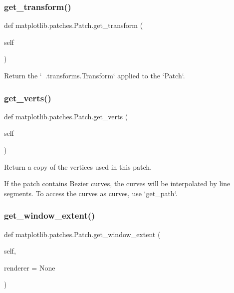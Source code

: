 \subsubsection{\texorpdfstring{get\+\_\+transform()}{get\_transform()}}
{\footnotesize\ttfamily def matplotlib.\+patches.\+Patch.\+get\+\_\+transform (\begin{DoxyParamCaption}\item[{}]{self }\end{DoxyParamCaption})}

\begin{DoxyVerb}Return the `~.transforms.Transform` applied to the `Patch`.\end{DoxyVerb}
 \mbox{\label{classmatplotlib_1_1patches_1_1Patch_a285b62a8f1c9fbc9d8b5579355edb34f}} 
\subsubsection{\texorpdfstring{get\+\_\+verts()}{get\_verts()}}
{\footnotesize\ttfamily def matplotlib.\+patches.\+Patch.\+get\+\_\+verts (\begin{DoxyParamCaption}\item[{}]{self }\end{DoxyParamCaption})}

\begin{DoxyVerb}Return a copy of the vertices used in this patch.

If the patch contains Bezier curves, the curves will be interpolated by
line segments.  To access the curves as curves, use `get_path`.
\end{DoxyVerb}
 \mbox{\label{classmatplotlib_1_1patches_1_1Patch_ae60567c0f3dedb3c3abe17ac500705d2}} 
\subsubsection{\texorpdfstring{get\+\_\+window\+\_\+extent()}{get\_window\_extent()}}
{\footnotesize\ttfamily def matplotlib.\+patches.\+Patch.\+get\+\_\+window\+\_\+extent (\begin{DoxyParamCaption}\item[{}]{self,  }\item[{}]{renderer = {\ttfamily None} }\end{DoxyParamCaption})}

